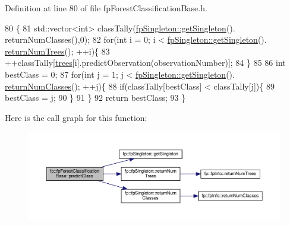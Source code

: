 Definition at line 80 of file fp\+Forest\+Classification\+Base.\+h.


\begin{DoxyCode}
80                                                    \{
81                 std::vector<int> classTally(\hyperlink{classfp_1_1fpSingleton_a8bdae77b68521003e3fc630edec2e240}{fpSingleton::getSingleton}().
      returnNumClasses(),0);
82                 \textcolor{keywordflow}{for}(\textcolor{keywordtype}{int} i = 0; i < \hyperlink{classfp_1_1fpSingleton_a8bdae77b68521003e3fc630edec2e240}{fpSingleton::getSingleton}().
      \hyperlink{classfp_1_1fpSingleton_a8be36616345b6b77ce4c60b99cc2b91c}{returnNumTrees}(); ++i)\{
83                     ++classTally[\hyperlink{classfp_1_1fpForestClassificationBase_a51482a6c95c4b3cb42627f029c2d4662}{trees}[i].predictObservation(observationNumber)];
84                 \}
85 
86                 \textcolor{keywordtype}{int} bestClass = 0;
87                 \textcolor{keywordflow}{for}(\textcolor{keywordtype}{int} j = 1; j < \hyperlink{classfp_1_1fpSingleton_a8bdae77b68521003e3fc630edec2e240}{fpSingleton::getSingleton}().
      \hyperlink{classfp_1_1fpSingleton_a5602580110329a6b25602b1789e4e2c2}{returnNumClasses}(); ++j)\{
88                     \textcolor{keywordflow}{if}(classTally[bestClass] < classTally[j])\{
89                         bestClass = j;
90                     \}
91                 \}
92                 \textcolor{keywordflow}{return} bestClass;
93             \}
\end{DoxyCode}
Here is the call graph for this function\+:
\nopagebreak
\begin{figure}[H]
\begin{center}
\leavevmode
\includegraphics[width=350pt]{classfp_1_1fpForestClassificationBase_ad0c690fff971fab681467fbcd8762b5f_cgraph}
\end{center}
\end{figure}
\mbox{\label{classfp_1_1fpForestClassificationBase_a6b5243d32b468308a4f013ad5a9df2dd}} 
